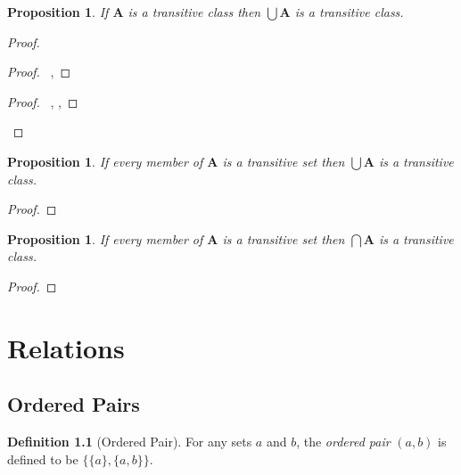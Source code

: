\documentclass{book}
\let\qed\relax
\newtheorem{prop}[ax]{Proposition}
\theoremstyle{definition}
\newtheorem{df}[ax]{Definition}
\begin{document}
\begin{prop}
\label{prop:uniontransitive}
If $\mathbf{A}$ is a transitive class then $\bigcup \mathbf{A}$ is a transitive class.
\end{prop}

\begin{proof}
\pf
{}
\begin{proof}
	\pf\ , 
\end{proof}
\begin{proof}
	\pf\ , , 
\end{proof}
\qed
\end{proof}

\begin{prop}
If every member of $\mathbf{A}$ is a transitive set then $\bigcup \mathbf{A}$ is a transitive class.
\end{prop}

\begin{proof}
\pf
{}
\qed
\end{proof}

\begin{prop}
If every member of $\mathbf{A}$ is a transitive set then $\bigcap \mathbf{A}$ is a transitive class.
\end{prop}

\begin{proof}
\pf
{}
\qed
\end{proof}

\chapter{Relations}

\section{Ordered Pairs}

\begin{df}[Ordered Pair]
For any sets $a$ and $b$, the \emph{ordered pair} $(a,b)$ is defined to be $\{ \{ a \}, \{a , b \} \}$.
\end{df}
\end{document}
